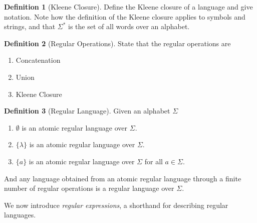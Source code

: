 \documentclass[12 pt, twoside, letterpaper]{article}
\newcommand{\note}[1]{\textit{\color{blue}{#1}}}
\theoremstyle{definition}
\newtheorem{definition}{Definition}
\theoremstyle{remark}
\theoremstyle{plain}
\begin{document}
	\iffalse
	\begin{definition}[Positive Closure]
		Define the positive closure of a set and give notation. 
		Also give notation and meaning for the set of nonempty words over an alphabet.
		\note{I'm not sure I actually need to include this.}
	\end{definition}
	\fi

	\begin{definition}[Kleene Closure]
		Define the Kleene closure of a language and give notation.
		Note how the definition of the Kleene closure applies to symbols and strings, and that $\Sigma^*$ is the set of all words over an alphabet.
	\end{definition}

	\begin{definition}[Regular Operations]
		State that the regular operations are 
		\begin{enumerate}[label=(\roman*), itemsep = -0.3 ex]
			\item Concatenation
			\item Union
			\item Kleene Closure
		\end{enumerate}
	\end{definition}

	\begin{definition}[Regular Language]
		Given an alphabet $\Sigma$
		\begin{enumerate}[label=(\roman*), itemsep = -0.3 ex]
			\item $\emptyset$ is an atomic regular language over $\Sigma$.
			\item $\{ \lambda \}$ is an atomic regular language over $\Sigma$.
			\item $\{ a \}$ is an atomic regular language over $\Sigma$ for all $a \in \Sigma$.
		\end{enumerate}
		And any language obtained from an atomic regular language through a finite number of regular operations is a regular language over $\Sigma$.
	\end{definition}

	We now introduce \textit{regular expressions}, a shorthand for describing regular languages.
\end{document}
